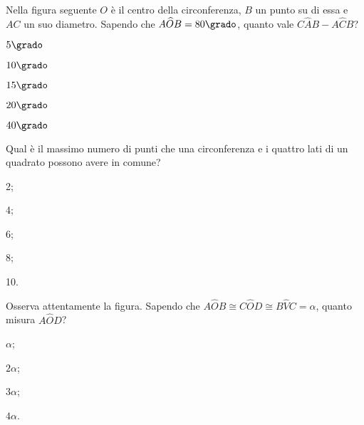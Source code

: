 \noindent\begin{minipage}{0.7\textwidth}\parindent15pt
\begin{esercizio}
\label{ese:5.62}
Nella figura seguente $O$ è il centro della circonferenza, $B$ un 
punto su di essa e $AC$ un suo diametro. Sapendo che 
$A\widehat{O}B=80\grado$, quanto vale $C\widehat{A}B-A\widehat{C}B$?
\begin{enumeratea}
\item $5\grado$
\item $10\grado$
\item $15\grado$
\item $20\grado$
\item $40\grado$
\end{enumeratea}
\end{esercizio}
\end{minipage}\hfil
\begin{minipage}{0.3\textwidth}
	\centering
\end{minipage}\vspace{5pt}

\begin{esercizio}
\label{ese:5.63}
Qual è il massimo numero di punti che una circonferenza e i quattro 
lati di un quadrato possono avere in comune?
\begin{multicols}{5}
\begin{enumeratea}
\item 2;
\item 4;
\item 6;
\item 8;
\item 10.
\end{enumeratea}
\end{multicols}
\end{esercizio}

\noindent\begin{minipage}{0.65\textwidth}\parindent15pt
\begin{esercizio}
\label{ese:5.64}
Osserva attentamente la figura. Sapendo che $A\widehat{O}B\cong 
C\widehat{O}D\cong B\widehat{V}C=\alpha$, quanto misura 
$A\widehat{O}D$?
\begin{multicols}{4}
\begin{enumeratea}
\item $\alpha$;
\item $2\alpha$;
\item $3\alpha$;
\item $4\alpha$.
\end{enumeratea}
\end{multicols}
\end{esercizio}
\end{minipage}\hfil
\begin{minipage}{0.35\textwidth}
	\centering
\end{minipage}\vspace{5pt}


